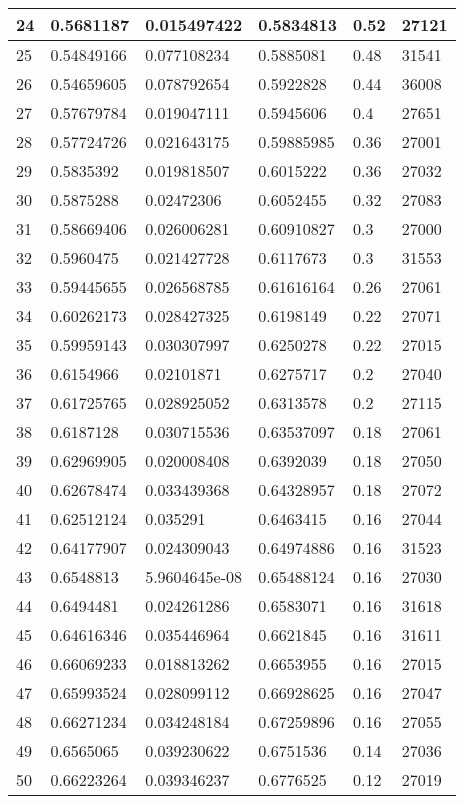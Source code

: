 \begin{longtable}{|l|l|l|l|l|l|}
24 & 0.5681187 & 0.015497422 & 0.5834813 & 0.52 & 27121 \\ \hline 
25 & 0.54849166 & 0.077108234 & 0.5885081 & 0.48 & 31541 \\ \hline 
26 & 0.54659605 & 0.078792654 & 0.5922828 & 0.44 & 36008 \\ \hline 
27 & 0.57679784 & 0.019047111 & 0.5945606 & 0.4 & 27651 \\ \hline 
28 & 0.57724726 & 0.021643175 & 0.59885985 & 0.36 & 27001 \\ \hline 
29 & 0.5835392 & 0.019818507 & 0.6015222 & 0.36 & 27032 \\ \hline 
30 & 0.5875288 & 0.02472306 & 0.6052455 & 0.32 & 27083 \\ \hline 
31 & 0.58669406 & 0.026006281 & 0.60910827 & 0.3 & 27000 \\ \hline 
32 & 0.5960475 & 0.021427728 & 0.6117673 & 0.3 & 31553 \\ \hline 
33 & 0.59445655 & 0.026568785 & 0.61616164 & 0.26 & 27061 \\ \hline 
34 & 0.60262173 & 0.028427325 & 0.6198149 & 0.22 & 27071 \\ \hline 
35 & 0.59959143 & 0.030307997 & 0.6250278 & 0.22 & 27015 \\ \hline 
36 & 0.6154966 & 0.02101871 & 0.6275717 & 0.2 & 27040 \\ \hline 
37 & 0.61725765 & 0.028925052 & 0.6313578 & 0.2 & 27115 \\ \hline 
38 & 0.6187128 & 0.030715536 & 0.63537097 & 0.18 & 27061 \\ \hline 
39 & 0.62969905 & 0.020008408 & 0.6392039 & 0.18 & 27050 \\ \hline 
40 & 0.62678474 & 0.033439368 & 0.64328957 & 0.18 & 27072 \\ \hline 
41 & 0.62512124 & 0.035291 & 0.6463415 & 0.16 & 27044 \\ \hline 
42 & 0.64177907 & 0.024309043 & 0.64974886 & 0.16 & 31523 \\ \hline 
43 & 0.6548813 & 5.9604645e-08 & 0.65488124 & 0.16 & 27030 \\ \hline 
44 & 0.6494481 & 0.024261286 & 0.6583071 & 0.16 & 31618 \\ \hline 
45 & 0.64616346 & 0.035446964 & 0.6621845 & 0.16 & 31611 \\ \hline 
46 & 0.66069233 & 0.018813262 & 0.6653955 & 0.16 & 27015 \\ \hline 
47 & 0.65993524 & 0.028099112 & 0.66928625 & 0.16 & 27047 \\ \hline 
48 & 0.66271234 & 0.034248184 & 0.67259896 & 0.16 & 27055 \\ \hline 
49 & 0.6565065 & 0.039230622 & 0.6751536 & 0.14 & 27036 \\ \hline 
50 & 0.66223264 & 0.039346237 & 0.6776525 & 0.12 & 27019 \\ \hline 
\end{longtable}